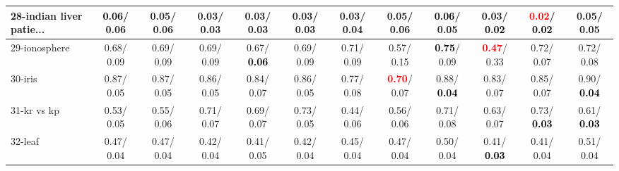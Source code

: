 \begin{table}[h]
\begin{center}
{\begin{tabular}{lc|c|c|c|c|c|c|c|c|c|c}
28-indian liver patie... & \textcolor{black}{\textbf{  0.06}}/  0.06 &   0.05/  0.06 &   0.03/  0.03 &   0.03/  0.03 &   0.03/  0.03 &   0.03/  0.04 &   0.05/  0.06 & \textcolor{black}{\textbf{  0.06}}/  0.05 &   0.03/\textcolor{black}{\textbf{  0.02}} & \textcolor{red}{\textbf{  0.02}}/\textcolor{black}{\textbf{  0.02}} &   0.05/  0.05 \\ \hline
29-ionosphere &   0.68/  0.09 &   0.69/  0.09 &   0.69/  0.09 &   0.67/\textcolor{black}{\textbf{  0.06}} &   0.69/  0.09 &   0.71/  0.09 &   0.57/  0.15 & \textcolor{black}{\textbf{  0.75}}/  0.09 & \textcolor{red}{\textbf{  0.47}}/  0.33 &   0.72/  0.07 &   0.72/  0.08 \\
30-iris &   0.87/  0.05 &   0.87/  0.05 &   0.86/  0.05 &   0.84/  0.07 &   0.86/  0.05 &   0.77/  0.08 & \textcolor{red}{\textbf{  0.70}}/  0.07 &   0.88/\textcolor{black}{\textbf{  0.04}} &   0.83/  0.07 &   0.85/  0.07 &   0.90/\textcolor{black}{\textbf{  0.04}} \\
31-kr vs kp &   0.53/  0.05 &   0.55/  0.06 &   0.71/  0.07 &   0.69/  0.07 &   0.73/  0.05 &   0.44/  0.06 &   0.56/  0.06 &   0.71/  0.08 &   0.63/  0.07 &   0.73/\textcolor{black}{\textbf{  0.03}} &   0.61/\textcolor{black}{\textbf{  0.03}} \\
32-leaf &   0.47/  0.04 &   0.47/  0.04 &   0.42/  0.04 &   0.41/  0.05 &   0.42/  0.04 &   0.45/  0.04 &   0.47/  0.04 &   0.50/  0.04 &   0.41/\textcolor{black}{\textbf{  0.03}} &   0.41/  0.04 &   0.51/  0.04 \\\end{tabular}}\label{stratsALCKappa0aVFDT}
\end{center}
\end{table}

